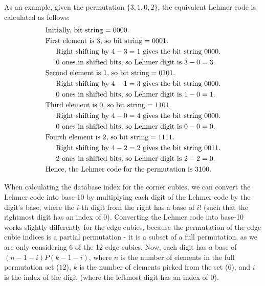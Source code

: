 As an example, given the permutation $\{3, 1, 0, 2\}$, the equivalent Lehmer code is calculated as follows:
\begin{align*}
&\text{Initially, bit string $=0000$.}\\
&\text{First element is 3, so bit string} = 0001 \text{.}\\
&\text{\hspace{0.4cm} Right shifting by $4-3=1$ gives the bit string $0000$.}\\
&\text{\hspace{0.4cm} $0$ ones in shifted bits, so Lehmer digit is $3-0=3$.}\\
&\text{Second element is 1, so bit string} = 0101 \text{.}\\
&\text{\hspace{0.4cm} Right shifting by $4-1=3$ gives the bit string $0000$.}\\
&\text{\hspace{0.4cm} $0$ ones in shifted bits, so Lehmer digit is $1-0=1$.}\\
&\text{Third element is 0, so bit string} = 1101 \text{.}\\
&\text{\hspace{0.4cm} Right shifting by $4-0=4$ gives the bit string $0000$.}\\
&\text{\hspace{0.4cm} $0$ ones in shifted bits, so Lehmer digit is $0-0=0$.}\\
&\text{Fourth element is 2, so bit string} = 1111 \text{.}\\
&\text{\hspace{0.4cm} Right shifting by $4-2=2$ gives the bit string $0011$.}\\
&\text{\hspace{0.4cm} $2$ ones in shifted bits, so Lehmer digit is $2-2=0$.}\\
&\text{Hence, the Lehmer code for the permutation is $3100$.}\\
\end{align*}

When calculating the database index for the corner cubies, we can convert the Lehmer code into base-10 by multiplying each digit of the Lehmer code by the digit's base, where the $i$-th digit from the right has a base of $i!$ (such that the rightmost digit has an index of $0$). Converting the Lehmer code into base-10 works slightly differently for the edge cubies, because the permutation of the edge cubie indices is a partial permutation - it is a subset of a full permutation, as we are only considering 6 of the 12 edge cubies. Now, each digit has a base of $(n-1-i)P(k-1-i)$, where $n$ is the number of elements in the full permutation set ($12$), $k$ is the number of elements picked from the set ($6$), and $i$ is the index of the digit (where the leftmost digit has an index of 0).

